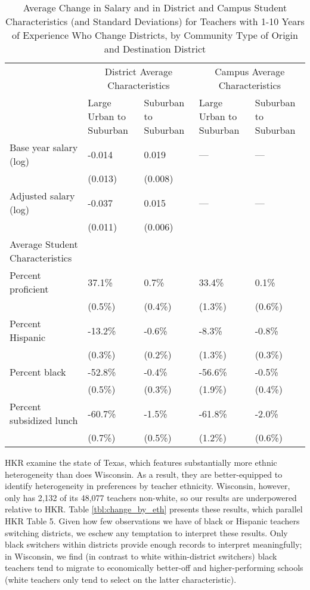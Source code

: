 \documentclass[]{article}
\begin{document}
\begin{table}[htbp]
\centering
\begin{tabular}{lp{}p{}p{}p{}}
  \hline
 & \multicolumn{2}{c}{District Average Characteristics} & \multicolumn{2}{c}{Campus Average Characteristics}\\ \cline{2-5}
 & Large Urban to Suburban & Suburban to Suburban & Large Urban to Suburban & Suburban to Suburban \\
  \hline
Base year salary (log) & -0.014 & 0.019 & --- & --- \\ 
   & (0.013) & (0.008) &  &  \\ 
  Adjusted salary (log) & -0.037 & 0.015 & --- & --- \\ 
   & (0.011) & (0.006) &  &  \\ 
Average Student Characteristics & & & & \\
  \quad Percent proficient & 37.1\% & 0.7\% & 33.4\% & 0.1\% \\ 
   & (0.5\%) & (0.4\%) & (1.3\%) & (0.6\%) \\ 
  \quad Percent Hispanic & -13.2\% & -0.6\% & -8.3\% & -0.8\% \\ 
   & (0.3\%) & (0.2\%) & (1.3\%) & (0.3\%) \\ 
  \quad Percent black & -52.8\% & -0.4\% & -56.6\% & -0.5\% \\ 
   & (0.5\%) & (0.3\%) & (1.9\%) & (0.4\%) \\ 
  \quad Percent subsidized lunch & -60.7\% & -1.5\% & -61.8\% & -2.0\% \\ 
   & (0.7\%) & (0.5\%) & (1.2\%) & (0.6\%) \\ 
   \hline
\end{tabular}
\caption{Average Change in Salary and in District and Campus Student Characteristics (and Standard Deviations) for Teachers with 1-10 Years of Experience Who Change Districts, by Community Type of Origin and Destination District} 
\label{tbl:change_by_urb}
\end{table}

HKR examine the state of Texas, which features substantially more ethnic
heterogeneity than does Wisconsin. As a result, they are better-equipped
to identify heterogeneity in preferences by teacher ethnicity.
Wisconsin, however, only has 2,132 of its 48,077 teachers non-white, so
our results are underpowered relative to HKR. Table
\ref{tbl:change_by_eth} presents these results, which parallel HKR Table
5. Given how few observations we have of black or Hispanic teachers
switching districts, we eschew any temptation to interpret these
results. Only black switchers within districts provide enough records to
interpret meaningfully; in Wisconsin, we find (in contrast to white
within-district switchers) black teachers tend to migrate to
economically better-off and higher-performing schools (white teachers
only tend to select on the latter characteristic).
\end{document}
